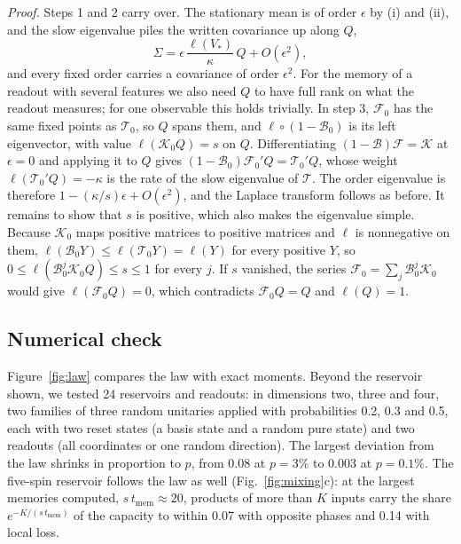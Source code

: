\emph{Proof.} Steps 1 and 2 carry over. The stationary mean is of order $\epsilon$ by (i) and (ii), and the slow
eigenvalue piles the written covariance up along $Q$,
\begin{equation*}
  \Sigma=\epsilon\,\frac{\ell(V_*)}{\kappa}\,Q+O(\epsilon^2),
\end{equation*}
and every fixed order carries a covariance of order $\epsilon^2$. For the memory of a readout with several features we
also need $Q$ to have full rank on what the readout measures; for one observable this holds trivially. In step 3,
$\mathcal F_0$ has the same fixed points as $\mathcal T_0$, so $Q$ spans them, and $\ell\circ(1-\mathcal B_0)$ is its
left eigenvector, with value $\ell(\mathcal K_0Q)=s$ on $Q$. Differentiating $(1-\mathcal B)\mathcal F=\mathcal K$ at
$\epsilon=0$ and applying it to $Q$ gives $(1-\mathcal B_0)\mathcal F_0'Q=\mathcal T_0'Q$, whose weight
$\ell(\mathcal T_0'Q)=-\kappa$ is the rate of the slow eigenvalue of $\mathcal T$. The order eigenvalue is
therefore $1-(\kappa/s)\epsilon+O(\epsilon^2)$, and the Laplace transform follows as before. It remains to show that $s$ is positive, which also makes the eigenvalue
simple. Because $\mathcal K_0$ maps positive matrices to positive matrices and $\ell$ is nonnegative on them,
$\ell(\mathcal B_0Y)\le\ell(\mathcal T_0Y)=\ell(Y)$ for every positive $Y$, so $0\le\ell(\mathcal
B_0^j\mathcal K_0Q)\le s\le1$ for every $j$. If $s$ vanished, the series $\mathcal F_0=\sum_j\mathcal B_0^j\mathcal
K_0$ would give $\ell(\mathcal F_0Q)=0$, which contradicts $\mathcal F_0Q=Q$ and $\ell(Q)=1$.

\subsection{Numerical check}
Figure~\ref{fig:law} compares the law with exact moments. Beyond the reservoir shown, we tested 24 reservoirs and
readouts: in dimensions two, three and four, two families of three random unitaries applied with probabilities 0.2,
0.3 and 0.5, each with two reset states (a basis state and a random pure state) and two readouts (all coordinates or
one random direction). The largest deviation from the law shrinks in proportion to $p$, from 0.08 at $p=3\%$ to 0.003 at
$p=0.1\%$. The five-spin reservoir follows the law as well (Fig.~\ref{fig:mixing}c): at the largest memories
computed, $s\,t_{\mathrm{mem}}\approx20$, products of more than $K$ inputs carry the share
$e^{-K/(s\,t_{\mathrm{mem}})}$ of the capacity to within 0.07 with opposite phases and 0.14 with local loss.

